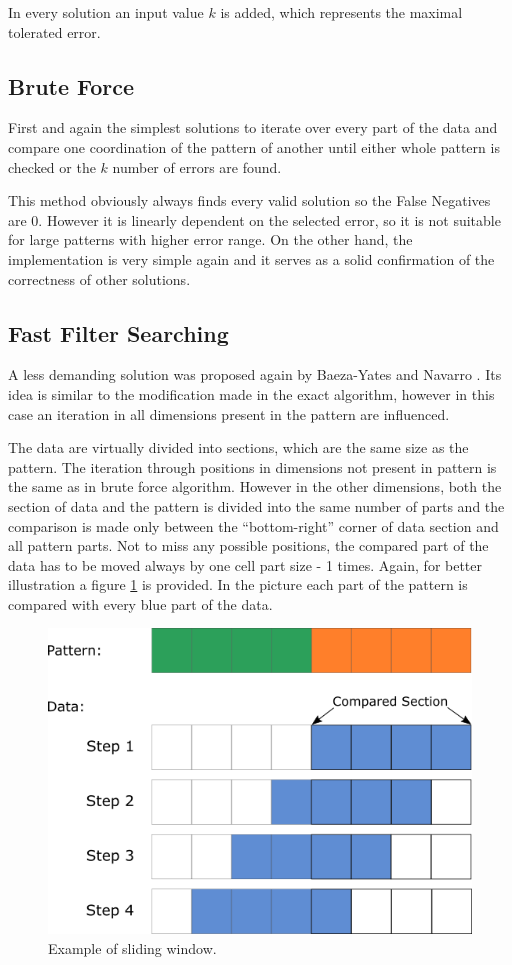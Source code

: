 In every solution an input value $k$ is added, which represents the maximal tolerated error.

\subsection{Brute Force}
First and again the simplest solutions to iterate over every part of the data and compare one coordination of the pattern of another until either whole pattern is checked or the $k$ number of errors are found.

This method obviously always finds every valid solution so the False Negatives are 0. However it is linearly dependent on the selected error, so it is not suitable for large patterns with higher error range. On the other hand, the implementation is very simple again and it serves as a solid confirmation of the correctness of other solutions.

\subsection{Fast Filter Searching}
A less demanding solution was proposed again by Baeza-Yates and Navarro \cite{mdApproxPM}. Its idea is similar to the modification made in the exact algorithm, however in this case an iteration in all dimensions present in the pattern are influenced.

The data are virtually divided into sections, which are the same size as the pattern. The iteration through positions in dimensions not present in pattern is the same as in brute force algorithm. However in the other dimensions, both the section of data and the pattern is divided into the same number of parts and the comparison is made only between the ``bottom-right'' corner of data section and all pattern parts. Not to miss any possible positions, the compared part of the data has to be moved always by one cell part size - 1 times. Again, for better illustration a figure \ref{fig_slide} is provided. In the picture each part of the pattern is compared with every blue part of the data.

\begin{figure}
\centering
\includegraphics[width=\textwidth]{slide}
\caption{Example of sliding window.}
\label{fig_slide}
\end{figure}


